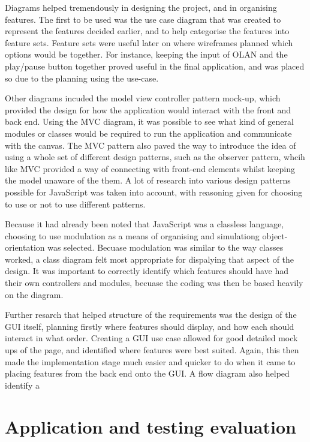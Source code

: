 Diagrams helped tremendously in designing the project, and in organising features. The first to be used was the use case diagram that was created to represent the features decided earlier, and to help categorise the features into feature sets. Feature sets were useful later on where wireframes planned which options would be together. For instance, keeping the input of OLAN and the play/pause button together proved useful in the final application, and was placed so due to the planning using the use-case.

Other diagrams incuded the model view controller pattern mock-up, which provided the design for how the application would interact with the front and back end. Using the MVC diagram, it was possible to see what kind of general modules or classes would be required to run the application and communicate with the canvas. The MVC pattern also paved the way to introduce the idea of using a whole set of different design patterns, such as the observer pattern, whcih like MVC provided a way of connecting with front-end elements whilst keeping the model unaware of the them. A lot of research into various design patterns possible for JavaScript was taken into account, with reasoning given for choosing to use or not to use different patterns.

Because it had already been noted that JavaScript was a classless language, choosing to use modulation as a means of organising and simulationg object-orientation was selected. Becuase modulation was similar to the way classes worked, a class diagram felt most appropriate for dispalying that aspect of the design. It was important to correctly identify which features should have had their own controllers and modules, becuase the coding was then be based heavily on the diagram.

Further resarch that helped structure of the requirements was the design of the GUI itself, planning firstly where features should display, and how each should interact in what order. Creating a GUI use case allowed for good detailed mock ups of the page, and identified where features were best suited. Again, this then made the implementation stage much easier and quicker to do when it came to placing features from the back end onto the GUI. A flow diagram also helped identify a 



\section{Application and testing evaluation}

